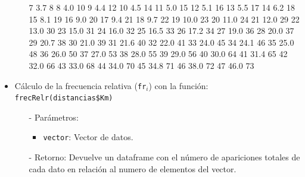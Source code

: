 \documentclass[a4paper, 12pt]{article}
\begin{document}
\begin{itemize}
\begin{itemize}
\begin{Schunk}
\begin{Soutput}
7    3.7           8
8    4.0          10
9    4.4          12
10   4.5          14
11   5.0          15
12   5.1          16
13   5.5          17
14   6.2          18
15   8.1          19
16   9.0          20
17   9.4          21
18   9.7          22
19  10.0          23
20  11.0          24
21  12.0          29
22  13.0          30
23  15.0          31
24  16.0          32
25  16.5          33
26  17.2          34
27  19.0          36
28  20.0          37
29  20.7          38
30  21.0          39
31  21.6          40
32  22.0          41
33  24.0          45
34  24.1          46
35  25.0          48
36  26.0          50
37  27.0          53
38  28.0          55
39  29.0          56
40  30.0          64
41  31.4          65
42  32.0          66
43  33.0          68
44  34.0          70
45  34.8          71
46  38.0          72
47  46.0          73
\end{Soutput}
\end{Schunk}
		\end{itemize}
		
		\item Cálculo de la frecuencia relativa (\texttt{fr$_{i}$}) con la función: \texttt{frecRelr(distancias\$Km)}
		\begin{itemize}
			\item[-] Parámetros: 
			\begin{itemize}
				\item \texttt{vector}: Vector de datos.
			\end{itemize}
			
			\item[-] Retorno: Devuelve un dataframe con el número de apariciones totales de cada dato en relación al numero de elementos del vector. 
			

\end{itemize}
\end{itemize}
\end{document}
